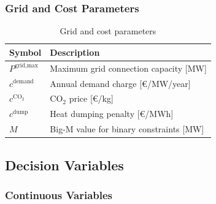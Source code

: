 \documentclass[11pt]{article}
\begin{document}
\subsubsection{Grid and Cost Parameters}

\begin{table}[h]
\centering
\begin{tabular}{ll}
\toprule
\textbf{Symbol} & \textbf{Description} \\
\midrule
$P^{\text{grid,max}}$ & Maximum grid connection capacity [MW] \\
$c^{\text{demand}}$ & Annual demand charge [\euro/MW/year] \\
$c^{\text{CO}_2}$ & CO$_2$ price [\euro/kg] \\
$c^{\text{dump}}$ & Heat dumping penalty [\euro/MWh] \\
$M$ & Big-M value for binary constraints [MW] \\
\bottomrule
\end{tabular}
\caption{Grid and cost parameters}
\label{tab:params_grid}
\end{table}

\subsection{Decision Variables}

\subsubsection{Continuous Variables}
\end{document}

